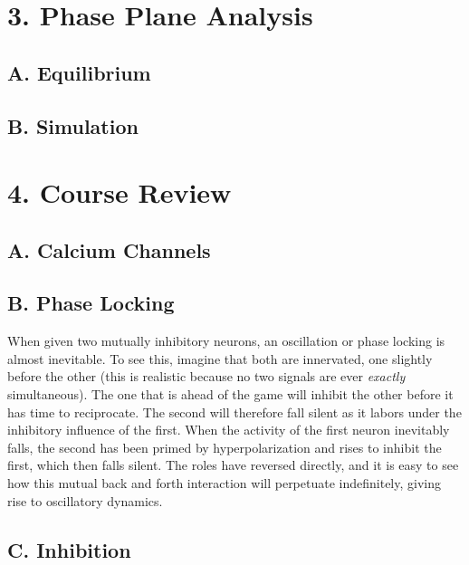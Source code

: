 \documentclass[12pt]{article}
\begin{document}
\maketitle

\section{3. Phase Plane Analysis}

\subsection{A. Equilibrium}



\subsection{B. Simulation}



\section{4. Course Review}

\subsection{A. Calcium Channels}



\subsection{B. Phase Locking}

When given two mutually inhibitory neurons, an oscillation or phase locking is almost inevitable.  To see this, imagine that both are innervated, one slightly before the other (this is realistic because no two signals are ever {\em exactly} simultaneous).  The one that is ahead of the game will inhibit the other before it has time to reciprocate.  The second will therefore fall silent as it labors under the inhibitory influence of the first.  When the activity of the first neuron inevitably falls, the second has been primed by hyperpolarization and rises to inhibit the first, which then falls silent.  The roles have reversed directly, and it is easy to see how this mutual back and forth interaction will perpetuate indefinitely, giving rise to oscillatory dynamics.

\subsection{C. Inhibition}
\end{document}
